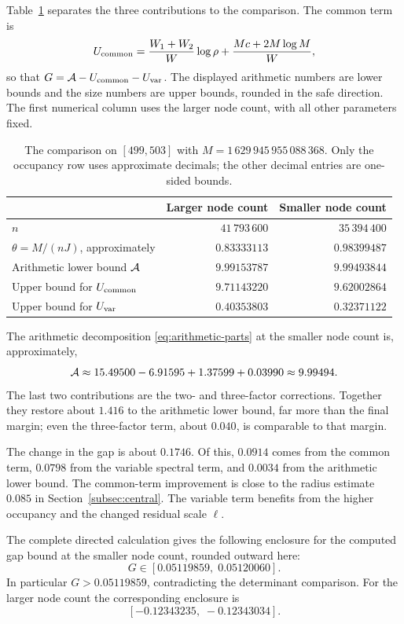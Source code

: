 Table~\ref{tab:499} separates the three contributions to the comparison.
The common term is
\[
 U_{\rm common}=\frac{W_1+W_2}{W}\log\rho+
                     \frac{Mc+2M\log M}{W},
\]
so that $G=\mathcal A-U_{\rm common}-U_{\rm var}$.
The displayed arithmetic numbers are lower bounds and the size numbers are
upper bounds, rounded in the safe direction. The first numerical column uses the larger node count, with all
other parameters fixed.
\begin{table}[ht]
\centering
\begin{tabular}{lrr}
\toprule
 & Larger node count & Smaller node count\\
\midrule
$n$ & $41\,793\,600$ & $35\,394\,400$\\
$\theta=M/(nJ)$, approximately & $0.83333113$ & $0.98399487$\\
Arithmetic lower bound $\mathcal A$ & $9.99153787$ & $9.99493844$\\
Upper bound for $U_{\rm common}$ & $9.71143220$ & $9.62002864$\\
Upper bound for $U_{\rm var}$ & $0.40353803$ & $0.32371122$\\
\bottomrule
\end{tabular}
\caption{The comparison on $[499,503]$ with $M=1\,629\,945\,955\,088\,368$.
Only the occupancy row uses approximate decimals; the other decimal entries
are one-sided bounds.}
\label{tab:499}
\end{table}

The arithmetic decomposition \eqref{eq:arithmetic-parts} at the smaller
node count is, approximately,
\[
 \mathcal A\approx15.49500-6.91595+1.37599+0.03990\approx9.99494.
\]
The last two contributions are the two- and three-factor corrections.
Together they restore about $1.416$ to the arithmetic lower bound, far more
than the final margin; even the three-factor term, about $0.040$, is
comparable to that margin.

The change in the gap is about $0.1746$. Of this, $0.0914$ comes from the
common term, $0.0798$ from the variable spectral term, and $0.0034$ from the
arithmetic lower bound. The common-term improvement is close to the radius
estimate $0.085$ in Section~\ref{subsec:central}. The variable term benefits
from the higher occupancy and the changed residual scale $\ell$. 

The complete directed calculation gives the following enclosure for the
computed gap bound at the smaller node count, rounded outward here:
\begin{equation}\label{eq:499-gap}
 G\in[0.05119859,\;0.05120060].
\end{equation}
In particular $G>0.05119859$, contradicting the determinant comparison.
For the larger node count the corresponding enclosure is
\[
 [-0.12343235,\;-0.12343034].
\]

